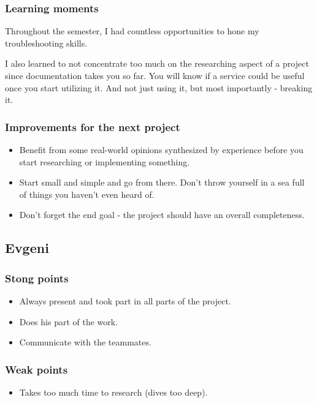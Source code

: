 \documentclass[10pt, a4paper]{article}
\begin{document}
\subsubsection{Learning moments}

Throughout the semester, I had countless opportunities to hone my troubleshooting skills.

I also learned to not concentrate too much on the researching aspect of a project since documentation takes you so far. You will know if a service could be useful once you start utilizing it. And not just using it, but most importantly - breaking it.

\subsubsection{Improvements for the next project}
\begin{itemize}
    \item Benefit from some real-world opinions synthesized by experience before you start researching or implementing something. 
    \item Start small and simple and go from there. Don't throw yourself in a sea full of things you haven't even heard of.
    \item Don't forget the end goal - the project should have an overall completeness.
\end{itemize}


\subsection{Evgeni}
\subsubsection{Stong points}
\begin{itemize}
	\item Always present and took part in all parts of the project.
	\item Does his part of the work.
	\item Communicate with the teammates.
\end{itemize}


\subsubsection{Weak points}
\begin{itemize}
	\item Takes too much time to research (dives too deep).
\end{itemize}
\end{document}
